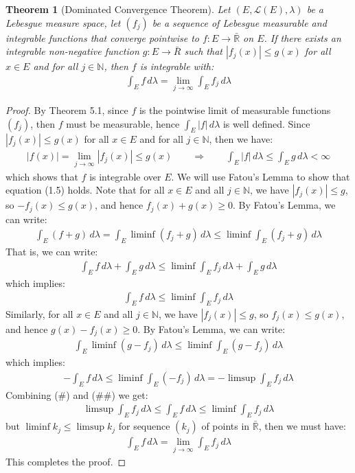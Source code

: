 \documentclass[11pt]{book}
\theoremstyle{break}
\theoremstyle{break}
\newtheorem{thm}{Theorem}[section]
\newcommand{\R}{\mathbb{R}}
\newcommand{\N}{\mathbb{N}}
\begin{document}
\newpage
\begin{thm}[Dominated Convergence Theorem]
Let $(E,\mathcal{L}(E),\lambda)$ be a Lebesgue measure space, let $(f_j)$ be a sequence of Lebesgue measurable and integrable functions that converge pointwise to $f:E \to \bar{\R}$ on $E$. If there exists an integrable non-negative function $g:E \to \bar{R}$ such that $|f_j(x) | \leq g(x)$ for all $x \in E$ and for all $j \in \N$, then $f$ is integrable with:
\begin{align}
\int_E f\, d\lambda = \lim_{j\to \infty}\int_E f_j \, d\lambda
\end{align}
\end{thm}
\begin{proof}
By Theorem 5.1, since $f$ is the pointwise limit of measurable functions $(f_j)$, then $f$ must be measurable, hence $\int_E |f| \,  d\lambda$ is well defined. Since $|f_j(x)| \leq g(x)$ for all $x \in E$ and for all $j\in \N$, then we have:
\begin{align*}
|f(x) | = \lim_{j \to \infty}|f_j(x)| \leq g(x) \qquad \Rightarrow \qquad \int_E |f|\, d\lambda \leq \int_E g\, d\lambda < \infty
\end{align*}
which shows that $f$ is integrable over $E$. We will use Fatou's Lemma to show that equation (1.5) holds. Note that for all $x \in E$ and all $j \in \N$, we have $|f_j(x) | \leq g$, so $-f_j (x)\leq g(x)$, and hence $f_j(x) + g(x) \geq 0$. By Fatou's Lemma, we can write:
\begin{align*}
\int_E (f+g) \, d\lambda = \int_E \liminf (f_j+g) \, d\lambda  \leq \liminf \int_E (f_j +g) \, d\lambda
\end{align*}
That is, we can write:
\begin{align*}
\int_E f\, d\lambda + \int_E g\, d\lambda \leq \liminf \int_E f_j \, d\lambda + \int_E g\, d\lambda 
\end{align*}
which implies:
\begin{align*}
\int_E f\, d\lambda \leq \liminf \int_E f_j \, d\lambda \tag{\#}
\end{align*}
Similarly, for all $x \in E$ and all $j \in \N$, we have $|f_j(x) | \leq g$, so $f_j(x) \leq g(x)$, and hence $ g(x) - f_j(x) \geq 0$. By Fatou's Lemma, we can write:
\begin{align*}
\int_E \liminf (g-f_j) \,d\lambda \leq \liminf \int_E(g-f_j) \, d\lambda
\end{align*}
which implies:
\begin{align*}
-\int_E f\, d\lambda \leq \liminf\int_E (-f_j) \, d\lambda = -\limsup \int_E f_j \, d\lambda \tag{\#\#}
\end{align*}
Combining (\#) and (\#\#) we get:
\begin{align*}
\limsup \int_E f_j \, d\lambda \leq \int_E f\, d\lambda \leq \liminf \int_E f_j \, d\lambda
\end{align*}
but $\liminf k_j \leq \limsup k_j$ for sequence $(k_j)$ of points in $\bar{\R}$, then we must have:
\begin{align*}
\int_E f\, d\lambda = \lim_{j\to \infty}\int_E f_j\, d\lambda
\end{align*} 
This completes the proof.
\end{proof}
\end{document}
